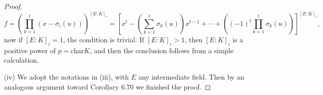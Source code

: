\begin{proof}
$$
f=\left( \prod_{k=1}^t{\left( x-\sigma _i\left( u \right) \right)} \right) ^{\left[ E:K \right] _i}=\left[ x^t-\left( \sum_{k=1}^t{\sigma _k\left( u \right)} \right) x^{t-1}+\cdots +\left( \left( -1 \right) ^t\prod_{k=1}^t{\sigma _k\left( u \right)} \right) \right] ^{\left[ E:K \right] _i},
$$
now if $[E:K]_i=1$, the condition is trivial. If $[E:K]_i>1$, then $[E:K]_i$ is a positive power of $p=\mathrm{char}K$, and then the conclusion follows from a simple calculation.\par
(iv) We adopt the notations in (iii), with $E$ any intermediate field. Then by an analogous argument toward Corollary 6.70 we finished the proof.
\end{proof}